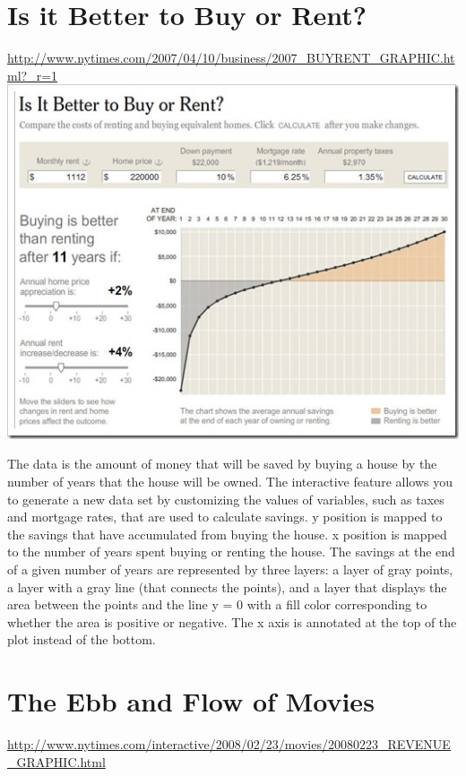 \documentclass{article}
\begin{document}
\section{Is it Better to Buy or Rent?}
\href{http://www.nytimes.com/2007/04/10/business/2007\_BUYRENT\_GRAPHIC.html?\_r=1}{http://www.nytimes.com/2007/04/10/business/2007\_BUYRENT\_GRAPHIC.html?\_r=1}\\

  \includegraphics[width=1.0\textwidth]{plots/nytimesBuyOrRent.jpg} %

The data is the amount of money that will be saved by buying a house by the number of years that the house will be owned. The interactive feature allows you to generate a new data set by customizing the values of variables, such as taxes and mortgage rates, that are used to calculate savings. y position is mapped to the savings that have accumulated from buying the house. x position is mapped to the number of years spent buying or renting the house. The savings at the end of a given number of years are represented by three layers: a layer of gray points, a layer with a gray line (that connects the points), and a layer that displays the area between the points and the line y = 0 with a fill color corresponding to whether the area is positive or negative. The x axis is annotated at the top of the plot instead of the bottom.



\section{The Ebb and Flow of Movies}
\href{http://www.nytimes.com/interactive/2008/02/23/movies/20080223\_REVENUE\_GRAPHIC.html}{http://www.nytimes.com/interactive/2008/02/23/movies/20080223\_REVENUE\_GRAPHIC.html}\\
\end{document}
